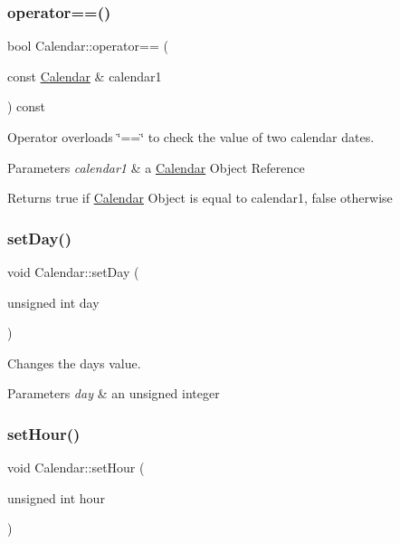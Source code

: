 \subsubsection{\texorpdfstring{operator==()}{operator==()}}
{\footnotesize\ttfamily bool Calendar\+::operator== (\begin{DoxyParamCaption}\item[{const \hyperlink{class_calendar}{Calendar} \&}]{calendar1 }\end{DoxyParamCaption}) const}



Operator overloads \char`\"{}==\char`\"{} to check the value of two calendar dates. 


\begin{DoxyParams}{Parameters}
{\em calendar1} & a \hyperlink{class_calendar}{Calendar} Object Reference \\
\hline
\end{DoxyParams}
\begin{DoxyReturn}{Returns}
true if \hyperlink{class_calendar}{Calendar} Object is equal to calendar1, false otherwise 
\end{DoxyReturn}
\mbox{\label{class_calendar_a84834635f8245a0b2f9ae69b4f31382e}} 
\subsubsection{\texorpdfstring{set\+Day()}{setDay()}}
{\footnotesize\ttfamily void Calendar\+::set\+Day (\begin{DoxyParamCaption}\item[{unsigned int}]{day }\end{DoxyParamCaption})}



Changes the day\textquotesingle{}s value. 


\begin{DoxyParams}{Parameters}
{\em day} & an unsigned integer \\
\hline
\end{DoxyParams}
\mbox{\label{class_calendar_a6f3e8a86bdbf5ad261084b91a6f880e7}} 
\subsubsection{\texorpdfstring{set\+Hour()}{setHour()}}
{\footnotesize\ttfamily void Calendar\+::set\+Hour (\begin{DoxyParamCaption}\item[{unsigned int}]{hour }\end{DoxyParamCaption})}




